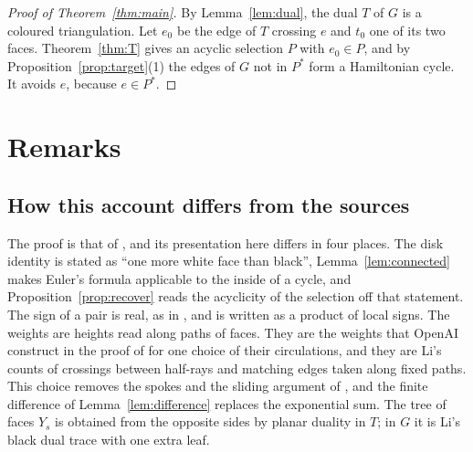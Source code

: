 \documentclass[10pt]{amsart}
\numberwithin{equation}{section}
\theoremstyle{definition}
\theoremstyle{remark}
\newcommand{\T}{T}
\begin{document}
\begin{proof}[Proof of Theorem~\ref{thm:main}]
By Lemma~\ref{lem:dual}, the dual $\T$ of $G$ is a coloured triangulation.
Let $e_0$ be the edge of $\T$ crossing $e$ and $t_0$ one of its two faces.
Theorem~\ref{thm:T} gives an acyclic selection $P$ with $e_0\in P$, and by Proposition~\ref{prop:target}(1) the edges of $G$ not in $P^*$ form a Hamiltonian cycle.
It avoids $e$, because $e\in P^*$.
\end{proof}

\section{Remarks}\label{sec:remarks}

\subsection*{How this account differs from the sources}
The proof is that of \cite{OpenAI2026}, and its presentation here differs in four places.
The disk identity is stated as ``one more white face than black'', Lemma~\ref{lem:connected} makes Euler's formula applicable to the inside of a cycle, and Proposition~\ref{prop:recover} reads the acyclicity of the selection off that statement.
The sign of a pair is real, as in \cite{Anonymous2026}, and is written as a product of local signs.
The weights are heights read along paths of faces.
They are the weights that OpenAI construct in the proof of \cite[Lemma~5.3]{OpenAI2026} for one choice of their circulations, and they are Li's counts of crossings between half-rays and matching edges \cite[Section~4]{Li2026} taken along fixed paths.
This choice removes the spokes and the sliding argument of \cite[Section~5.3]{OpenAI2026}, and the finite difference of Lemma~\ref{lem:difference} replaces the exponential sum.
The tree of faces $Y_s$ is obtained from the opposite sides by planar duality in $\T$; in $G$ it is Li's black dual trace \cite[Section~6]{Li2026} with one extra leaf.
\end{document}
